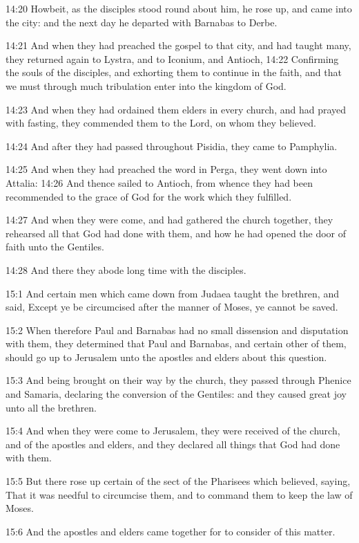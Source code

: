 14:20 Howbeit, as the disciples stood round about him, he rose up, and came into the city: and the next day he departed with Barnabas to Derbe.

14:21 And when they had preached the gospel to that city, and had taught many, they returned again to Lystra, and to Iconium, and Antioch, 14:22 Confirming the souls of the disciples, and exhorting them to continue in the faith, and that we must through much tribulation enter into the kingdom of God.

14:23 And when they had ordained them elders in every church, and had prayed with fasting, they commended them to the Lord, on whom they believed.

14:24 And after they had passed throughout Pisidia, they came to Pamphylia.

14:25 And when they had preached the word in Perga, they went down into Attalia: 14:26 And thence sailed to Antioch, from whence they had been recommended to the grace of God for the work which they fulfilled.

14:27 And when they were come, and had gathered the church together, they rehearsed all that God had done with them, and how he had opened the door of faith unto the Gentiles.

14:28 And there they abode long time with the disciples.

15:1 And certain men which came down from Judaea taught the brethren, and said, Except ye be circumcised after the manner of Moses, ye cannot be saved.

15:2 When therefore Paul and Barnabas had no small dissension and disputation with them, they determined that Paul and Barnabas, and certain other of them, should go up to Jerusalem unto the apostles and elders about this question.

15:3 And being brought on their way by the church, they passed through Phenice and Samaria, declaring the conversion of the Gentiles: and they caused great joy unto all the brethren.

15:4 And when they were come to Jerusalem, they were received of the church, and of the apostles and elders, and they declared all things that God had done with them.

15:5 But there rose up certain of the sect of the Pharisees which believed, saying, That it was needful to circumcise them, and to command them to keep the law of Moses.

15:6 And the apostles and elders came together for to consider of this matter.

